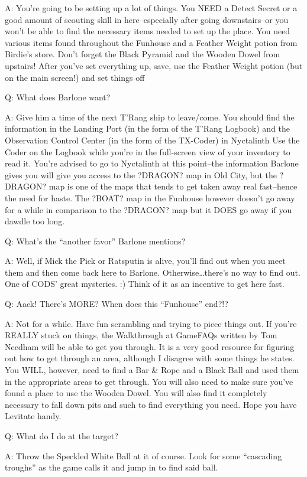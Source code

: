 \documentclass[12pt]{article}
\begin{document}
A: You're going to be setting up a lot of things. You NEED a Detect
Secret or a good amount of scouting skill in here--especially after
going downstairs--or you won't be able to find the necessary items
needed to set up the place. You need various items found throughout the
Funhouse and a Feather Weight potion from Birdie's store. Don't forget
the Black Pyramid and the Wooden Dowel from upstairs! After you've set
everything up, save, use the Feather Weight potion (but on the main
screen!) and set things off

Q: What does Barlone want?

A: Give him a time of the next T'Rang ship to leave/come. You should
find the information in the Landing Port (in the form of the T'Rang
Logbook) and the Observation Control Center (in the form of the
TX-Coder) in Nyctalinth Use the Coder on the Logbook while you're in the
full-screen view of your inventory to read it. You're advised to go to
Nyctalinth at this point--the information Barlone gives you will give
you access to the ?DRAGON? map in Old City, but the ?DRAGON? map is one
of the maps that tends to get taken away real fast--hence the need for
haste. The ?BOAT? map in the Funhouse however doesn't go away for a
while in comparison to the ?DRAGON? map but it DOES go away if you
dawdle too long.

Q: What's the ``another favor'' Barlone mentions?

A: Well, if Mick the Pick or Ratsputin is alive, you'll find out when
you meet them and then come back here to Barlone.
Otherwise\ldots{}there's no way to find out. One of CODS' great
mysteries. :) Think of it as an incentive to get here fast.

Q: Aack! There's MORE? When does this ``Funhouse'' end?!?

A: Not for a while. Have fun scrambling and trying to piece things out.
If you're REALLY stuck on things, the Walkthrough at GameFAQs written by
Tom Needham will be able to get you through. It is a very good resource
for figuring out how to get through an area, although I disagree with
some things he states. You WILL, however, need to find a Bar \& Rope and
a Black Ball and used them in the appropriate areas to get through. You
will also need to make sure you've found a place to use the Wooden
Dowel. You will also find it completely necessary to fall down pits and
such to find everything you need. Hope you have Levitate handy.

Q: What do I do at the target?

A: Throw the Speckled White Ball at it of course. Look for some
``cascading troughs'' as the game calls it and jump in to find said
ball.
\end{document}
